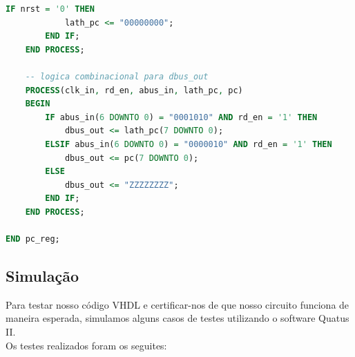 \documentclass{article}
\begin{document}
\begin{lstlisting}[language=VHDL, caption={Código VHDL pc\_reg}]
        IF nrst = '0' THEN
            lath_pc <= "00000000";
        END IF;
    END PROCESS;

    -- logica combinacional para dbus_out
    PROCESS(clk_in, rd_en, abus_in, lath_pc, pc)
    BEGIN
        IF abus_in(6 DOWNTO 0) = "0001010" AND rd_en = '1' THEN
            dbus_out <= lath_pc(7 DOWNTO 0);
        ELSIF abus_in(6 DOWNTO 0) = "0000010" AND rd_en = '1' THEN
            dbus_out <= pc(7 DOWNTO 0);
        ELSE
            dbus_out <= "ZZZZZZZZ";
        END IF;
    END PROCESS;

END pc_reg;
\end{lstlisting}

\subsection{Simulação}

Para testar nosso código VHDL e certificar-nos de que nosso circuito funciona de maneira esperada, simulamos alguns casos de testes utilizando o software Quatus II.\\

Os testes realizados foram os seguites:
\end{document}
